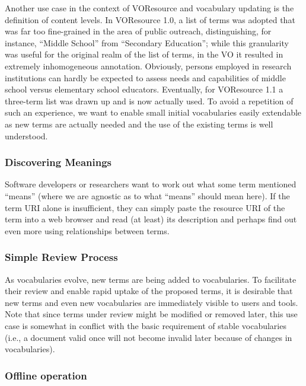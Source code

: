 \documentclass[11pt,a4paper]{ivoa}
\begin{document}
Another use case in the context of VOResource and vocabulary updating
is the definition of content levels.  In VOResource 1.0, a list of
terms was adopted that was far too fine-grained in the area of public
outreach, distinguishing, for instance, ``Middle School'' from
``Secondary Education''; while this granularity was useful for the
original realm of the list of terms, in the VO it resulted in extremely
inhomogeneous annotation.  Obviously, persons employed in research
institutions can hardly be expected to assess needs and capabilities of
middle school versus elementary school educators.  Eventually, for
VOResource 1.1 a three-term list was drawn up and is now actually used.
To avoid a repetition of such an experience, we want to enable small
initial vocabularies easily extendable as new terms are actually needed
and the use of the existing terms is well understood.


\subsubsection{Discovering Meanings}
\label{uc:discovering}

Software developers or researchers want to work out
what some term mentioned ``means'' (where we are agnostic as to what
``means'' should mean here).  If the term URI alone is insufficient,
they can simply paste the resource URI of the term into a web browser
and read (at least) its description and perhaps find out even more using
relationships between terms.

\subsubsection{Simple Review Process}
\label{uc:simplereview}

As vocabularies evolve, new terms are being added to
vocabularies.  To facilitate their review and enable rapid uptake
of the proposed terms, it is desirable that new terms and even
new vocabularies are immediately visible to users and tools.
Note that since terms under review might be modified or removed later,
this use case is somewhat in conflict with the basic requirement
of stable vocabularies (i.e., a document valid once will not
become invalid later because of changes in vocabularies).

\subsubsection{Offline operation}
\label{uc:offline}
\end{document}
